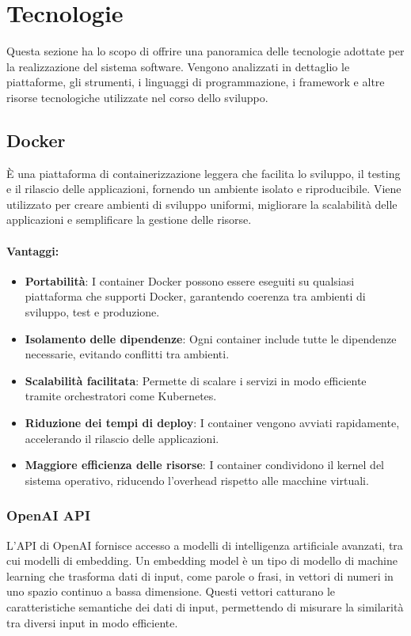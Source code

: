 \section{Tecnologie}
Questa sezione ha lo scopo di offrire una panoramica delle tecnologie adottate per la realizzazione del sistema software. Vengono analizzati in dettaglio le piattaforme, gli strumenti, i linguaggi di programmazione, i framework e altre risorse tecnologiche utilizzate nel corso dello sviluppo.


\subsection{Docker} 
È una piattaforma di containerizzazione leggera che facilita lo sviluppo, il testing e il rilascio delle applicazioni, fornendo un ambiente isolato e riproducibile. 
Viene utilizzato per creare ambienti di sviluppo uniformi, migliorare la scalabilità delle applicazioni e semplificare la gestione delle risorse. 

\paragraph{Vantaggi:} 
\begin{itemize} 
    \item \textbf{Portabilità}: I container Docker possono essere eseguiti su qualsiasi piattaforma che supporti Docker, garantendo coerenza tra ambienti di sviluppo, test e produzione. 
    \item \textbf{Isolamento delle dipendenze}: Ogni container include tutte le dipendenze necessarie, evitando conflitti tra ambienti. 
    \item \textbf{Scalabilità facilitata}: Permette di scalare i servizi in modo efficiente tramite orchestratori come Kubernetes. 
    \item \textbf{Riduzione dei tempi di deploy}: I container vengono avviati rapidamente, accelerando il rilascio delle applicazioni. 
    \item \textbf{Maggiore efficienza delle risorse}: I container condividono il kernel del sistema operativo, riducendo l'overhead rispetto alle macchine virtuali. 
\end{itemize} 


\subsubsection{OpenAI API}
L'API di OpenAI fornisce accesso a modelli di intelligenza artificiale avanzati, tra cui modelli di embedding. Un embedding model è un tipo di modello di machine learning che trasforma dati di input, come parole o frasi, in vettori di numeri in uno spazio continuo a bassa dimensione. Questi vettori catturano le caratteristiche semantiche dei dati di input, permettendo di misurare la similarità tra diversi input in modo efficiente.

